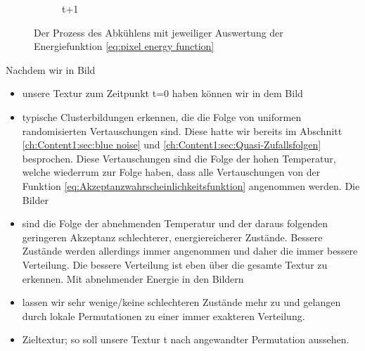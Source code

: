\begin{figure}[H]
\begin{subfigure}[b]{0.2\linewidth}
        \caption{ t+1}
        \label{pic:dither1}
    \end{subfigure}
    \caption{Der Prozess des Abkühlens mit jeweiliger Auswertung der Energiefunktion \ref{eq:pixel energy function}}
    \label{fig:annelaing animated}
    
  \end{figure}

  Nachdem wir in Bild 
  \begin{itemize}
    \item[\ref{pic:dither0}] unsere  Textur zum Zeitpunkt t=0 
                              haben können wir in dem Bild
    \item[\ref{pic:abkühl_schritt_1}] typische Clusterbildungen erkennen, die die Folge von 
                                    uniformen randomisierten Vertauschungen sind. Diese hatte wir bereits 
                                    im Abschnitt \ref{ch:Content1:sec:blue noise} und \ref{ch:Content1:sec:Quasi-Zufallsfolgen}
                                    besprochen. Diese Vertauschungen sind die Folge der hohen Temperatur, welche wiederrum zur Folge haben, 
                                    dass alle Vertauschungen von der Funktion \ref{eq:Akzeptanzwahrscheinlichkeitsfunktion} angenommen werden. 
                                    Die Bilder  
    \item[\ref{pic:abkühl_schritt_2}-\ref{pic:abkühl_schritt_4}] sind die Folge der abnehmenden Temperatur und der daraus folgenden geringeren 
                                    Akzeptanz schlechterer, energiereicherer Zustände. Bessere Zustände werden allerdings immer angenommen und 
                                    daher die immer bessere  Verteilung. Die bessere Verteilung ist eben über 
                                    die gesamte Textur zu erkennen. Mit abnehmender Energie in den Bildern   
    \item[\ref{pic:abkühl_schritt_5}-\ref{pic:abkühl_schritt_8}] lassen wir sehr wenige/keine schlechteren Zustände mehr zu und gelangen durch 
                                    lokale Permutationen zu einer immer exakteren Verteilung.  
    \item[\ref{pic:dither1}] Zieltextur; so soll unsere Textur t nach angewandter 
                              Permutation aussehen. 
  \end{itemize}





